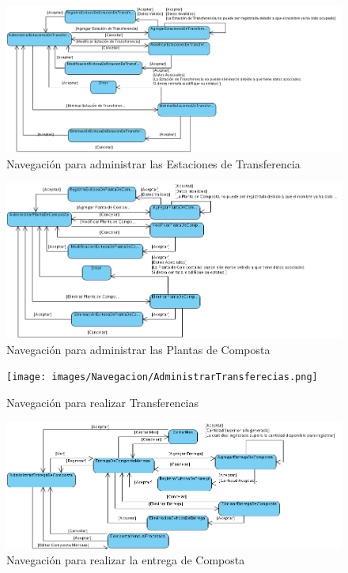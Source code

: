 	\begin{figure}[h!]
		\centering
			\includegraphics[scale=0.5]{images/Navegacion/AdministrarEstacionesDeTransferencia.png}
		\caption{Navegación para administrar las Estaciones de Transferencia}
	\end{figure}
\newpage
	\begin{figure}[h!]
		\centering
			\includegraphics[scale=0.5]{images/Navegacion/AdministrarPlantasDeComposta.png}
		\caption{Navegación para administrar las Plantas de Composta}
	\end{figure}

	\begin{figure}[h!]
		\centering
			\texttt{[image: images/Navegacion/AdministrarTransferecias.png]}
		\caption{Navegación para realizar Transferencias}
	\end{figure}
\newpage
	\begin{figure}[h!]
		\centering
			\includegraphics[scale=0.5]{images/Navegacion/NavegacionAdministrarEntregaDeComposta.png}
		\caption{Navegación para realizar la entrega de Composta}
	\end{figure}
\newpage